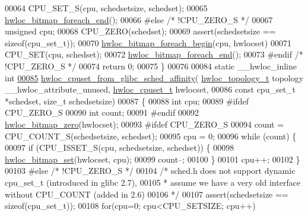 \begin{DoxyCode}
00064     CPU\_SET\_S(cpu, schedsetsize, schedset);
00065   \hyperlink{a00205_gafcf3246db406218d4e155735b3fa6528}{hwloc\_bitmap\_foreach\_end}();
00066 \textcolor{preprocessor}{#else }\textcolor{comment}{/* !CPU\_ZERO\_S */}\textcolor{preprocessor}{}
00067   \textcolor{keywordtype}{unsigned} cpu;
00068   CPU\_ZERO(schedset);
00069   assert(schedsetsize == \textcolor{keyword}{sizeof}(cpu\_set\_t));
00070   \hyperlink{a00205_ga3f6861045a8029ade373510ffa727d2a}{hwloc\_bitmap\_foreach\_begin}(cpu, hwlocset)
00071     CPU\_SET(cpu, schedset);
00072   \hyperlink{a00205_gafcf3246db406218d4e155735b3fa6528}{hwloc\_bitmap\_foreach\_end}();
00073 \textcolor{preprocessor}{#endif }\textcolor{comment}{/* !CPU\_ZERO\_S */}\textcolor{preprocessor}{}
00074   \textcolor{keywordflow}{return} 0;
00075 \}
00076 
00084 \textcolor{keyword}{static} \_\_hwloc\_inline \textcolor{keywordtype}{int}
\hyperlink{a00217_ga8ec807ec17de57fa77aa5cfd6c8e4bfb}{00085} \hyperlink{a00217_ga8ec807ec17de57fa77aa5cfd6c8e4bfb}{hwloc\_cpuset\_from\_glibc\_sched\_affinity}(
      \hyperlink{a00186_ga9d1e76ee15a7dee158b786c30b6a6e38}{hwloc\_topology\_t} topology \_\_hwloc\_attribute\_unused, 
      \hyperlink{a00183_ga4bbf39b68b6f568fb92739e7c0ea7801}{hwloc\_cpuset\_t} hwlocset,
00086                                        \textcolor{keyword}{const} cpu\_set\_t *schedset, \textcolor{keywordtype}{size\_t} schedsetsize)
00087 \{
00088   \textcolor{keywordtype}{int} cpu;
00089 \textcolor{preprocessor}{#ifdef CPU\_ZERO\_S}
00090   \textcolor{keywordtype}{int} count;
00091 \textcolor{preprocessor}{#endif}
00092   \hyperlink{a00205_gaa97c5217613c8cae9862287170ea2132}{hwloc\_bitmap\_zero}(hwlocset);
00093 \textcolor{preprocessor}{#ifdef CPU\_ZERO\_S}
00094   count = CPU\_COUNT\_S(schedsetsize, schedset);
00095   cpu = 0;
00096   \textcolor{keywordflow}{while} (count) \{
00097     \textcolor{keywordflow}{if} (CPU\_ISSET\_S(cpu, schedsetsize, schedset)) \{
00098       \hyperlink{a00205_ga062dbff93baeff3b425a7260c5463646}{hwloc\_bitmap\_set}(hwlocset, cpu);
00099       count--;
00100     \}
00101     cpu++;
00102   \}
00103 \textcolor{preprocessor}{#else }\textcolor{comment}{/* !CPU\_ZERO\_S */}\textcolor{preprocessor}{}
00104   \textcolor{comment}{/* sched.h does not support dynamic cpu\_set\_t (introduced in glibc 2.7),}
00105 \textcolor{comment}{   * assume we have a very old interface without CPU\_COUNT (added in 2.6)}
00106 \textcolor{comment}{   */}
00107   assert(schedsetsize == \textcolor{keyword}{sizeof}(cpu\_set\_t));
00108   \textcolor{keywordflow}{for}(cpu=0; cpu<CPU\_SETSIZE; cpu++)

\end{DoxyCode}
